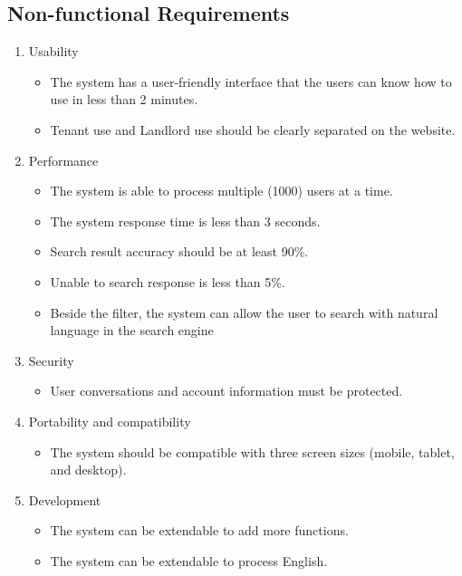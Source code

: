 \subsection{Non-functional Requirements}
\begin{enumerate}
    \item Usability
    \begin{itemize}
        \item The system has a user-friendly interface that the users can know how to use in less than 2 minutes.
        \item Tenant use and Landlord use should be clearly separated on the website.
    \end{itemize}
    \item Performance
    \begin{itemize}
        \item The system is able to process multiple (1000) users at a time.
        \item The system response time is less than 3 seconds.
        \item Search result accuracy should be at least 90\%.
        \item Unable to search response is less than 5\%.
        \item Beside the filter, the system can allow the user to search with natural language in the search engine
    \end{itemize}
    \item Security
    \begin{itemize}
        \item User conversations and account information must be protected.
    \end{itemize}
    \item Portability and compatibility
    \begin{itemize}
        \item The system should be compatible with three screen sizes (mobile, tablet, and desktop).
    \end{itemize}
    \item Development
    \begin{itemize}
        \item The system can be extendable to add more functions.
        \item The system can be extendable to process English.
    \end{itemize}
\end{enumerate}


\newpage
